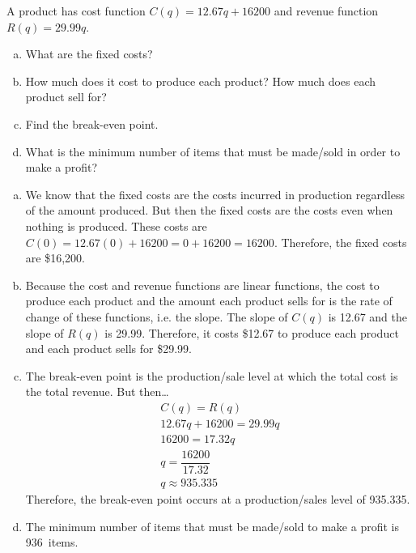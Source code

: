 \documentclass[11pt,letterpaper]{article}
\begin{document}
\newpage



 A product has cost function $C(q)= 12.67q + 16200$ and revenue function $R(q)= 29.99q$. 
	\begin{enumerate}[(a)]
	\item What are the fixed costs? 
	\item How much does it cost to produce each product? How much does each product sell for?
	\item Find the break-even point.
	\item What is the minimum number of items that must be made/sold in order to make a profit?
	\end{enumerate} \pspace

\sol 
\begin{enumerate}[(a)]
\item We know that the fixed costs are the costs incurred in production regardless of the amount produced. But then the fixed costs are the costs even when nothing is produced. These costs are $C(0)= 12.67(0) + 16200= 0 + 16200= 16200$. Therefore, the fixed costs are \$16,200. \pspace

\item Because the cost and revenue functions are linear functions, the cost to produce each product and the amount each product sells for is the rate of change of these functions, i.e. the slope. The slope of $C(q)$ is 12.67 and the slope of $R(q)$ is 29.99. Therefore, it costs \$12.67 to produce each product and each product sells for \$29.99. \pspace

\item The break-even point is the production/sale level at which the total cost is the total revenue. But then\dots
	\[
	\begin{gathered}
	C(q)= R(q) \\
	12.67q + 16200= 29.99q \\
	16200= 17.32q \\
	q= \dfrac{16200}{17.32} \\
	q \approx  935.335
	\end{gathered}
	\]
Therefore, the break-even point occurs at a production/sales level of 935.335. \pspace

\item The minimum number of items that must be made/sold to make a profit is 936~items. 
\end{enumerate}
\end{document}
